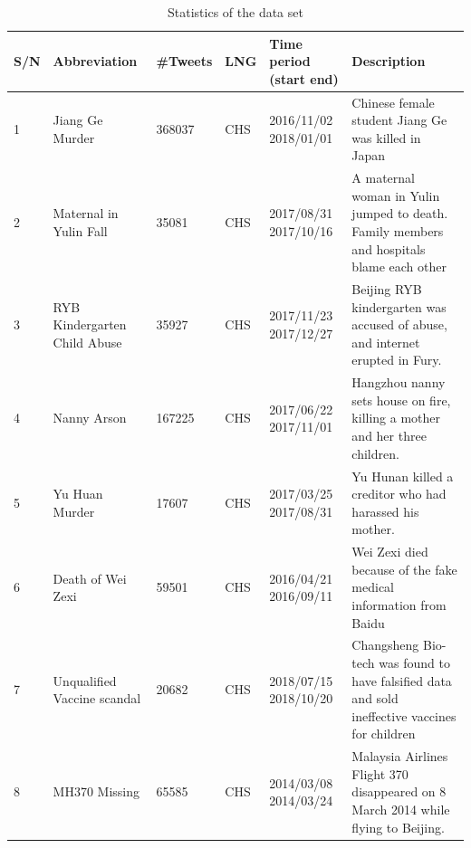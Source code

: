\documentclass[runningheads]{llncs}
\begin{document}
\begin{table}
\begin{center}
\tiny
\caption{Statistics of the data set}\label{table:social event}
\begin{tabular}{m{0.5cm}<{\centering}m{2.0cm}<{\centering}m{1.2cm}<{\centering}m{0.5cm}<{\centering}m{3cm}<{\centering}m{4.5cm}<{\centering}}
\hline
S/N & Abbreviation                 & \#Tweets & LNG & Time period (start end) & Description                                                                                                                  \\ \hline
1&Jiang Ge Murder              & 368037   & CHS & 2016/11/02 2018/01/01   & Chinese female student Jiang Ge was killed in Japan                                                                          \\ \hline
2&Maternal in Yulin Fall       & 35081    & CHS & 2017/08/31 2017/10/16   & A maternal woman in Yulin jumped to death. Family members and hospitals blame each other                                     \\ \hline
3&RYB Kindergarten Child Abuse & 35927    & CHS & 2017/11/23 2017/12/27   & Beijing RYB kindergarten was accused of abuse, and internet erupted in Fury.                                                 \\ \hline
4&Nanny Arson                  & 167225   & CHS & 2017/06/22 2017/11/01   & Hangzhou nanny sets house on fire, killing a mother and her three children.                                                  \\ \hline
5&Yu Huan Murder               & 17607    & CHS & 2017/03/25 2017/08/31   & Yu Hunan killed a creditor who had harassed his mother.                                                                      \\ \hline
6&Death of Wei Zexi            & 59501    & CHS & 2016/04/21 2016/09/11   & Wei Zexi died because of the fake medical information from Baidu                                                             \\ \hline
7&Unqualified Vaccine scandal  & 20682    & CHS & 2018/07/15 2018/10/20   & Changsheng Bio-tech was found to have falsified data and sold ineffective vaccines for children                              \\ \hline
8&MH370 Missing                & 65585    & CHS & 2014/03/08 2014/03/24   & Malaysia Airlines Flight 370 disappeared on 8 March 2014 while flying to Beijing.                                            \\ \hline

\end{tabular}
\end{center}
\end{table}
\end{document}
